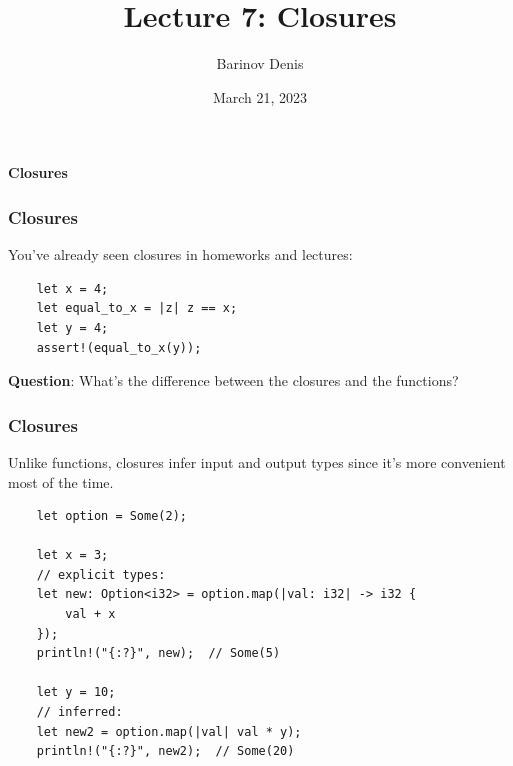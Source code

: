\documentclass[aspectratio=1610,t]{beamer}
\title{Lecture 7: Closures}
\date{March 21, 2023}
\author{Barinov Denis}
\institute{barinov.diu@gmail.com}
\begin{document}

\begin{frame}
\maketitle
\end{frame}


\begin{frame}[c]
\centering\Huge\textbf{Closures}
\end{frame}


\begin{frame}[fragile]
\frametitle{Closures}
You've already seen closures in homeworks and lectures:

\begin{verbatim}
    let x = 4;
    let equal_to_x = |z| z == x;
    let y = 4;
    assert!(equal_to_x(y));
\end{verbatim}

\textbf{Question}: What's the difference between the closures and the functions?

\end{frame}


\begin{frame}[fragile]
\frametitle{Closures}
Unlike functions, closures infer input and output types since it's more convenient most of the time.

\begin{verbatim}
    let option = Some(2);

    let x = 3;
    // explicit types:
    let new: Option<i32> = option.map(|val: i32| -> i32 {
        val + x
    });
    println!("{:?}", new);  // Some(5)

    let y = 10;
    // inferred:
    let new2 = option.map(|val| val * y);
    println!("{:?}", new2);  // Some(20)
\end{verbatim}
\end{frame}

\end{document}
